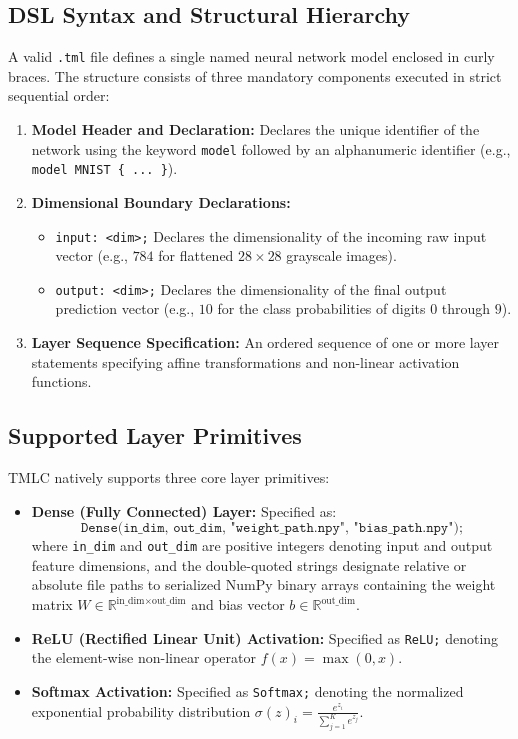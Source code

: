 \documentclass[11pt,a4paper]{article}
\begin{document}
\subsection{DSL Syntax and Structural Hierarchy}
A valid \texttt{.tml} file defines a single named neural network model enclosed in curly braces. The structure consists of three mandatory components executed in strict sequential order:
\begin{enumerate}
    \item \textbf{Model Header and Declaration:} Declares the unique identifier of the network using the keyword \texttt{model} followed by an alphanumeric identifier (e.g., \texttt{model MNIST \{ ... \}}).
    \item \textbf{Dimensional Boundary Declarations:}
    \begin{itemize}
        \item \texttt{input: <dim>;} Declares the dimensionality of the incoming raw input vector (e.g., $784$ for flattened $28 \times 28$ grayscale images).
        \item \texttt{output: <dim>;} Declares the dimensionality of the final output prediction vector (e.g., $10$ for the class probabilities of digits $0$ through $9$).
    \end{itemize}
    \item \textbf{Layer Sequence Specification:} An ordered sequence of one or more layer statements specifying affine transformations and non-linear activation functions.
\end{enumerate}

\subsection{Supported Layer Primitives}
TMLC natively supports three core layer primitives:
\begin{itemize}[leftmargin=*]
    \item \textbf{Dense (Fully Connected) Layer:} Specified as:
    \begin{equation}
        \texttt{Dense(in\_dim, out\_dim, "weight\_path.npy", "bias\_path.npy");}
    \end{equation}
    where \texttt{in\_dim} and \texttt{out\_dim} are positive integers denoting input and output feature dimensions, and the double-quoted strings designate relative or absolute file paths to serialized NumPy binary arrays containing the weight matrix $W \in \mathbb{R}^{\text{in\_dim} \times \text{out\_dim}}$ and bias vector $b \in \mathbb{R}^{\text{out\_dim}}$.
    \item \textbf{ReLU (Rectified Linear Unit) Activation:} Specified as \texttt{ReLU;} denoting the element-wise non-linear operator $f(x) = \max(0, x)$.
    \item \textbf{Softmax Activation:} Specified as \texttt{Softmax;} denoting the normalized exponential probability distribution $\sigma(z)_i = \frac{e^{z_i}}{\sum_{j=1}^K e^{z_j}}$.
\end{itemize}
\end{document}
